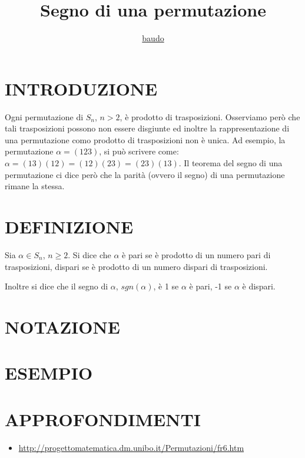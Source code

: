 \documentclass[a4paper,10pt]{article}
\title{Segno di una permutazione}
\author{\href{https://www.baudo.hol.es}{baudo}}
\begin{document}
\maketitle

\section{INTRODUZIONE}
Ogni permutazione di $S_n$, $n>2$, è prodotto di trasposizioni. Osserviamo però che tali trasposizioni possono non essere
disgiunte ed inoltre la rappresentazione di una permutazione como prodotto di trasposizioni non è unica. Ad esempio, la permutazione
$\alpha=(123)$, si può scrivere come: $\alpha=(13)(12)=(12)(23)=(23)(13)$. Il teorema del segno di una permutazione ci dice
però che la parità (ovvero il segno) di una permutazione rimane la stessa.

\section{DEFINIZIONE}
Sia $\alpha \in S_n$, $n \geq 2$. Si dice che $\alpha$ è pari se è prodotto di un numero pari di trasposizioni, dispari se è prodotto di un 
numero dispari di trasposizioni.

Inoltre si dice che il segno di $\alpha$, $sgn(\alpha)$, è 1 se $\alpha$ è pari, -1 se $\alpha$ è dispari.

\section{NOTAZIONE}

\section{ESEMPIO}

\section{APPROFONDIMENTI}
\begin{itemize}
 \item \url{http://progettomatematica.dm.unibo.it/Permutazioni/fr6.htm}
\end{itemize}
\end{document}
